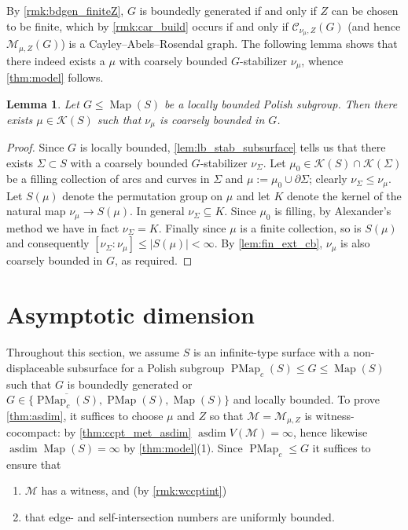 \documentclass[twoside]{amsart}
\theoremstyle{plain}
\newtheorem{lemma}[theorem]{Lemma}
\theoremstyle{break}
\theoremstyle{definition}
\theoremstyle{remark}
\DeclareMathOperator{\Map}{Map}
\DeclareMathOperator{\asdim}{asdim}
\newcommand{\cc}{\mathcal C}
\newcommand{\M}{\mathcal M}
\DeclareMathOperator{\PMap}{PMap}
\begin{document}
By \cref{rmk:bdgen_finiteZ}, $G$ is boundedly generated
if and only if $Z$ can be chosen to be finite, which by \cref{rmk:car_build}
occurs if and only if $\cc_{\nu_\mu,Z}(G)$ 
(and hence $\mathcal{M}_{\mu,Z}(G)$) is a Cayley--Abels--Rosendal graph. 
The following lemma shows that there indeed exists a $\mu$ with 
coarsely bounded $G$-stabilizer $\nu_\mu$, whence \cref{thm:model}
follows.

\begin{lemma}\label{lem:mu_exists}
  Let $G\leq\Map(S)$ be a locally bounded Polish 
  subgroup. Then there
  exists $\mu\in\mathcal{K}(S)$ such 
  that $\nu_\mu$ 
  is coarsely bounded in $G$. 
\end{lemma}

\begin{proof}
    Since $G$ is locally bounded, \cref{lem:lb_stab_subsurface} 
    tells us that there exists $\Sigma\subset S$ 
    with a coarsely bounded $G$-stabilizer $\nu_\Sigma$.
    Let $\mu_0\in\mathcal{K}(S)\cap\mathcal{K}(\Sigma)$ be a filling 
    collection of arcs and curves in $\Sigma$ and 
    $\mu:=\mu_0\cup\partial\Sigma$; clearly $\nu_\Sigma\leq\nu_\mu$. Let $S(\mu)$ 
    denote the permutation group on $\mu$ and let $K$ denote the kernel 
    of the natural map $\nu_{\mu}\rightarrow S(\mu)$. 
    In general 
    $\nu_\Sigma\subseteq K$. Since $\mu_0$ is filling, 
    by Alexander's method {\cite[Prop. ~2.8]{fm}} we have in fact 
    $\nu_\Sigma=K$. Finally since $\mu$ is a finite collection, 
    so is $S(\mu)$ and consequently $[\nu_\Sigma:\nu_\mu]\leq|S(\mu)|<\infty$.
    By \cref{lem:fin_ext_cb}, $\nu_\mu$  
    is also coarsely bounded in $G$, as required. 
\end{proof}

\section{Asymptotic dimension}\label{sec:nondisp}

Throughout this section, we assume $S$ is an infinite-type
surface with a non-displaceable subsurface for a 
Polish subgroup $\PMap_c(S) \leq G \leq \Map(S)$ such that $G$ is boundedly
generated or  $G \in
\{\overline{\PMap_c(S)},
\PMap(S), \Map(S)\}$ and locally bounded.  
To prove
\cref{thm:asdim}, it suffices to choose $\mu$ and $Z$ so that
 $\M = \M_{\mu,Z}$ %
 is witness-cocompact: by
\cref{thm:ccpt_met_asdim} $\asdim V(\M) = \infty$, hence likewise $\asdim
\Map(S) = \infty$ by \cref{thm:model}(1).  Since $\PMap_c \leq G$ it suffices to 
ensure that 
\begin{enumerate}[label=\textit{(\roman*)}]
  \item
  $\M$ has a witness, and (by \cref{rmk:wccptint}) 
\item 
that edge- and self-intersection numbers are uniformly bounded.
\end{enumerate}
\end{document}
